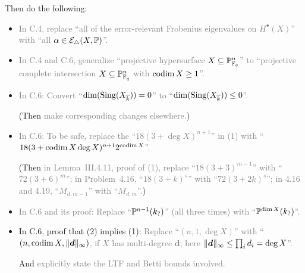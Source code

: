 \documentclass[12pt]{article}
\begin{document}
\begin{itemize}
    Then do the following:
    \begin{itemize}
        \item \textcolor{gray}{In C.4,
        replace ``all of the error-relevant Frobenius eigenvalues on $H^\bullet(X)$'' with ``all $\alpha\in \mathcal{E}_{\triangle}(X,\mathbb{P})$''.}
    
        \item \textcolor{gray}{In C.4 and C.6,
        generalize ``projective hypersurface $X\subseteq \mathbb{P}^n_{\mathbb{F}_q}$'' to ``projective complete intersection $X\subseteq \mathbb{P}^n_{\mathbb{F}_q}$ with $\operatorname{codim}{X}\geq 1$''.
        }
        
        \item \textcolor{gray}{In C.6:
        Convert ``$\dim(\operatorname{Sing}(X_{\overline{k}}))=0$'' to ``$\dim(\operatorname{Sing}(X_{\overline{k}}))\leq 0$''.}
        
        (Then \textcolor{gray}{make corresponding changes elsewhere.})
        
        \item \textcolor{gray}{In C.6:
        To be safe, replace the ``$18(3+\deg{X})^{n+1}$'' in (1) with ``$18(3+\operatorname{codim}{X}\deg{X})^{n+1}2^{\operatorname{codim}{X}}$''.}
        
        (Then \textcolor{gray}{in Lemma~III.4.11, proof of (1),
        replace ``$18(3+3)^{m-1}$'' with ``$72(3+6)^m$'';
        in Problem~4.16,
        ``$18(3+k)^s$'' with ``$72(3+2k)^s$'';
        in 4.16 and 4.19,
        ``$M_{d,m-1}$'' with ``$M_{d,m}$''.})
        
        \item \textcolor{gray}{In C.6 and its proof:
        Replace ``$\mathbb{P}^{n-1}(k_?)$'' (all three times) with ``$\mathbb{P}^{\dim{X}}(k_?)$''.}
        
        \item In C.6, proof that (2) implies (1):
        \textcolor{gray}{Replace ``$(n,1,\deg{X})$'' with ``$(n,\operatorname{codim}{X},\lVert \bm{d} \rVert_\infty)$,
        if $X$ has multi-degree $\bm{d}$;
        here $\lVert \bm{d} \rVert_\infty\leq \prod_{i}d_i = \deg{X}$''.}
        
        And \textcolor{gray}{explicitly state the LTF and Betti bounds involved.
        }
        

\end{itemize}
\end{itemize}
\end{document}

